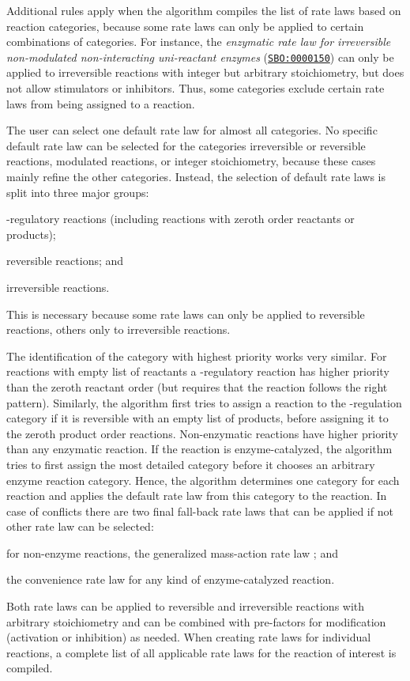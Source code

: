 Additional rules apply when the algorithm compiles the list of rate laws based on reaction categories, because some rate laws can only be applied to certain combinations of categories.
For instance, the \emph{enzymatic rate law for irreversible non-modulated non-interacting uni-reactant enzymes} (\href{http://identifiers.org/biomodels.sbo/SBO:0000150}{\texttt{SBO:0000150}}) can only be applied to irreversible reactions with integer but arbitrary stoichiometry, but does not allow stimulators or inhibitors.
Thus, some categories exclude certain rate laws from being assigned to a reaction.

The user can select one default rate law for almost all categories.
No specific default rate law can be selected for the categories irreversible or reversible reactions, modulated reactions, or integer stoichiometry, because these cases mainly refine the other categories.
Instead, the selection of default rate laws is split into three major groups:
\begin{enumerate*}[label=\itshape\alph*\upshape)]
  \item {\gene}-regulatory reactions (including reactions with zeroth order reactants or products);
  \item reversible reactions; and
  \item irreversible reactions.
\end{enumerate*}
This is necessary because some rate laws can only be applied to reversible reactions, others only to irreversible reactions.

The identification of the category with highest priority works very similar.
For reactions with empty list of reactants a {\gene}-regulatory reaction has higher priority than the zeroth reactant order (but requires that the reaction follows the right pattern).
Similarly, the algorithm first tries to assign a reaction to the {\gene}-regulation category if it is reversible with an empty list of products, before assigning it to the zeroth product order reactions.
Non-enzymatic reactions have higher priority than any enzymatic reaction.
If the reaction is enzyme-catalyzed, the algorithm tries to first assign the most detailed category before it chooses an arbitrary enzyme reaction category.
Hence, the algorithm determines one category for each reaction and applies the default rate law from this category to the reaction.
In case of conflicts there are two final fall-back rate laws that can be applied if not other rate law can be selected:
\begin{enumerate*}[label=\itshape\alph*\upshape)]
  \item for non-enzyme reactions, the generalized mass-action rate law \citep{Guldberg1879, Heinrich1996}; and
  \item the convenience rate law \citep{Liebermeister2006} for any kind of enzyme-catalyzed reaction.
\end{enumerate*}
Both rate laws can be applied to reversible and irreversible reactions with arbitrary stoichiometry and can be combined with pre-factors for modification (activation or inhibition) as needed.
When creating rate laws for individual reactions, a complete list of all applicable rate laws for the reaction of interest is compiled.

